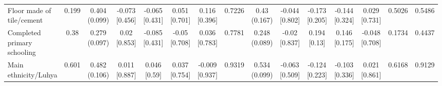 \documentclass[
]{article}
\begin{document}
\begin{table}
{\begin{tabular}[t]{lcccccccccccccc}
\addlinespace[0.3em]
\hline
\multicolumn{15}{l}{\textit{\textbf{Panel B: Baseline demographics, $N=252$}}}\\
\hline
\hspace{1em}Floor made of tile/cement & 0.199 & \makecell[c]{0.404\\(0.099)} & \makecell[c]{-0.073\\{[0.456]}} & \makecell[c]{-0.065\\{[0.431]}} & \makecell[c]{0.051\\{[0.701]}} & \makecell[c]{0.116\\{[0.396]}} & 0.7226 & \makecell[c]{0.43\\(0.167)} & \makecell[c]{-0.044\\{[0.802]}} & \makecell[c]{-0.173\\{[0.205]}} & \makecell[c]{-0.144\\{[0.324]}} & \makecell[c]{0.029\\{[0.731]}} & 0.5026 & 0.5486\\
\hspace{1em}Completed primary schooling & 0.38 & \makecell[c]{0.279\\(0.097)} & \makecell[c]{0.02\\{[0.853]}} & \makecell[c]{-0.085\\{[0.431]}} & \makecell[c]{-0.05\\{[0.708]}} & \makecell[c]{0.036\\{[0.783]}} & 0.7781 & \makecell[c]{0.248\\(0.089)} & \makecell[c]{-0.02\\{[0.837]}} & \makecell[c]{0.194\\{[0.13]}} & \makecell[c]{0.146\\{[0.175]}} & \makecell[c]{-0.048\\{[0.708]}} & 0.1734 & 0.4437\\
\hspace{1em}Main ethnicity/Luhya & 0.601 & \makecell[c]{0.482\\(0.106)} & \makecell[c]{0.011\\{[0.887]}} & \makecell[c]{0.046\\{[0.59]}} & \makecell[c]{0.037\\{[0.754]}} & \makecell[c]{-0.009\\{[0.937]}} & 0.9319 & \makecell[c]{0.534\\(0.099)} & \makecell[c]{-0.063\\{[0.509]}} & \makecell[c]{-0.124\\{[0.223]}} & \makecell[c]{-0.103\\{[0.336]}} & \makecell[c]{0.021\\{[0.861]}} & 0.6168 & 0.9129\\

\end{tabular}}
\end{table}
\end{document}
